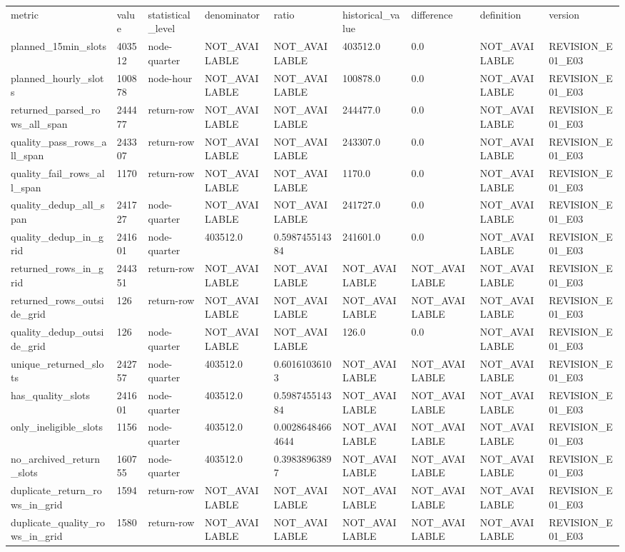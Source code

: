 \begin{longtable}{lllllllll}
metric & value & statistical\_level & denominator & ratio & historical\_value & difference & definition & version \\
planned\_15min\_slots & 403512 & node-quarter & NOT\_AVAILABLE & NOT\_AVAILABLE & 403512.0 & 0.0 & NOT\_AVAILABLE & REVISION\_E01\_E03 \\
planned\_hourly\_slots & 100878 & node-hour & NOT\_AVAILABLE & NOT\_AVAILABLE & 100878.0 & 0.0 & NOT\_AVAILABLE & REVISION\_E01\_E03 \\
returned\_parsed\_rows\_all\_span & 244477 & return-row & NOT\_AVAILABLE & NOT\_AVAILABLE & 244477.0 & 0.0 & NOT\_AVAILABLE & REVISION\_E01\_E03 \\
quality\_pass\_rows\_all\_span & 243307 & return-row & NOT\_AVAILABLE & NOT\_AVAILABLE & 243307.0 & 0.0 & NOT\_AVAILABLE & REVISION\_E01\_E03 \\
quality\_fail\_rows\_all\_span & 1170 & return-row & NOT\_AVAILABLE & NOT\_AVAILABLE & 1170.0 & 0.0 & NOT\_AVAILABLE & REVISION\_E01\_E03 \\
quality\_dedup\_all\_span & 241727 & node-quarter & NOT\_AVAILABLE & NOT\_AVAILABLE & 241727.0 & 0.0 & NOT\_AVAILABLE & REVISION\_E01\_E03 \\
quality\_dedup\_in\_grid & 241601 & node-quarter & 403512.0 & 0.598745514384 & 241601.0 & 0.0 & NOT\_AVAILABLE & REVISION\_E01\_E03 \\
returned\_rows\_in\_grid & 244351 & return-row & NOT\_AVAILABLE & NOT\_AVAILABLE & NOT\_AVAILABLE & NOT\_AVAILABLE & NOT\_AVAILABLE & REVISION\_E01\_E03 \\
returned\_rows\_outside\_grid & 126 & return-row & NOT\_AVAILABLE & NOT\_AVAILABLE & NOT\_AVAILABLE & NOT\_AVAILABLE & NOT\_AVAILABLE & REVISION\_E01\_E03 \\
quality\_dedup\_outside\_grid & 126 & node-quarter & NOT\_AVAILABLE & NOT\_AVAILABLE & 126.0 & 0.0 & NOT\_AVAILABLE & REVISION\_E01\_E03 \\
unique\_returned\_slots & 242757 & node-quarter & 403512.0 & 0.60161036103 & NOT\_AVAILABLE & NOT\_AVAILABLE & NOT\_AVAILABLE & REVISION\_E01\_E03 \\
has\_quality\_slots & 241601 & node-quarter & 403512.0 & 0.598745514384 & NOT\_AVAILABLE & NOT\_AVAILABLE & NOT\_AVAILABLE & REVISION\_E01\_E03 \\
only\_ineligible\_slots & 1156 & node-quarter & 403512.0 & 0.00286484664644 & NOT\_AVAILABLE & NOT\_AVAILABLE & NOT\_AVAILABLE & REVISION\_E01\_E03 \\
no\_archived\_return\_slots & 160755 & node-quarter & 403512.0 & 0.39838963897 & NOT\_AVAILABLE & NOT\_AVAILABLE & NOT\_AVAILABLE & REVISION\_E01\_E03 \\
duplicate\_return\_rows\_in\_grid & 1594 & return-row & NOT\_AVAILABLE & NOT\_AVAILABLE & NOT\_AVAILABLE & NOT\_AVAILABLE & NOT\_AVAILABLE & REVISION\_E01\_E03 \\
duplicate\_quality\_rows\_in\_grid & 1580 & return-row & NOT\_AVAILABLE & NOT\_AVAILABLE & NOT\_AVAILABLE & NOT\_AVAILABLE & NOT\_AVAILABLE & REVISION\_E01\_E03 \\
\end{longtable}
